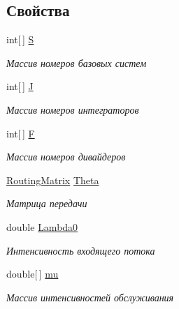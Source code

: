 \subsection*{Свойства}
\begin{DoxyCompactItemize}
\item 
int\mbox{[}$\,$\mbox{]} \hyperlink{class_exact_network_analysis_1_1_infinity_server_open_fork_join_network_ac72550bd668cf8677c84d4af4c80d905}{S}
\begin{DoxyCompactList}\small\item\em Массив номеров базовых систем \end{DoxyCompactList}\item 
int\mbox{[}$\,$\mbox{]} \hyperlink{class_exact_network_analysis_1_1_infinity_server_open_fork_join_network_a31fdadd622edf1475c3f31cd61c39ea4}{J}
\begin{DoxyCompactList}\small\item\em Массив номеров интеграторов \end{DoxyCompactList}\item 
int\mbox{[}$\,$\mbox{]} \hyperlink{class_exact_network_analysis_1_1_infinity_server_open_fork_join_network_a7fb7c18d2fb5cf56cb6835c4841cfd0c}{F}
\begin{DoxyCompactList}\small\item\em Массив номеров дивайдеров \end{DoxyCompactList}\item 
\hyperlink{class_network_descriptions_1_1_routing_matrix}{Routing\+Matrix} \hyperlink{class_exact_network_analysis_1_1_infinity_server_open_fork_join_network_a1b837b250c20167a9ac7391fc6bd714e}{Theta}
\begin{DoxyCompactList}\small\item\em Матрица передачи \end{DoxyCompactList}\item 
double \hyperlink{class_exact_network_analysis_1_1_infinity_server_open_fork_join_network_adaf8966418503408bfe47db8bd365ea1}{Lambda0}
\begin{DoxyCompactList}\small\item\em Интенсивность входящего потока \end{DoxyCompactList}\item 
double\mbox{[}$\,$\mbox{]} \hyperlink{class_exact_network_analysis_1_1_infinity_server_open_fork_join_network_aa234d13b5de6baaeae5f10d5e88c0a6b}{mu}
\begin{DoxyCompactList}\small\item\em Массив интенсивностей обслуживания \end{DoxyCompactList}\end{DoxyCompactItemize}


